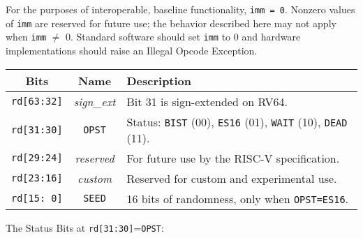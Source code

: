     For the purposes of interoperable, baseline functionality, \verb|imm = 0|.
    Nonzero values of \verb|imm| are reserved for future use; the behavior
    described here may not apply when \verb|imm| $\neq$ 0.
    Standard software should set \verb|imm| to $0$
    and hardware implementations should raise an Illegal Opcode Exception.

    \begin{center}
    \begin{tabular}{ccl}
    \toprule
    Bits    & Name  & Description \\
    \midrule
    \verb|rd[63:32]|    & {\it sign\_ext}
            & Bit 31 is sign-extended on RV64. \\
    \verb|rd[31:30]|    & \verb|OPST|
            & Status:   \verb|BIST| (00), \verb|ES16| (01),
                        \verb|WAIT| (10),   \verb|DEAD| (11). \\
    \verb|rd[29:24]|    & {\it reserved}
            & For future use by the RISC-V specification. \\
    \verb|rd[23:16]|    & {\it custom}
            & Reserved for custom and experimental use. \\
    \verb|rd[15: 0]|    & \verb|SEED|
            & 16 bits of randomness, only when \verb|OPST=ES16|.    \\
    \bottomrule
    \end{tabular}
    \end{center}

    The Status Bits at \verb|rd[31:30]|=\verb|OPST|:

